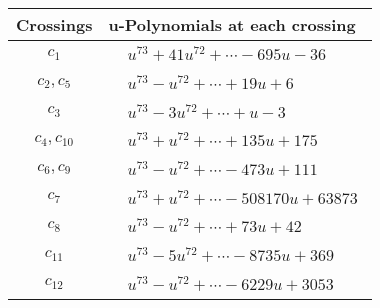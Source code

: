 \documentclass[1p]{elsarticle_modified}
\theoremstyle{definition}
\begin{document}
\begin{tabular}{m{50pt}|m{274pt}}
Crossings & \hspace{64pt}u-Polynomials at each crossing \\
\hline $$\begin{aligned}c_{1}\end{aligned}$$&$\begin{aligned}
&u^{73}+41 u^{72}+\cdots-695 u-36
\end{aligned}$\\
\hline $$\begin{aligned}c_{2},c_{5}\end{aligned}$$&$\begin{aligned}
&u^{73}- u^{72}+\cdots+19 u+6
\end{aligned}$\\
\hline $$\begin{aligned}c_{3}\end{aligned}$$&$\begin{aligned}
&u^{73}-3 u^{72}+\cdots+u-3
\end{aligned}$\\
\hline $$\begin{aligned}c_{4},c_{10}\end{aligned}$$&$\begin{aligned}
&u^{73}+u^{72}+\cdots+135 u+175
\end{aligned}$\\
\hline $$\begin{aligned}c_{6},c_{9}\end{aligned}$$&$\begin{aligned}
&u^{73}- u^{72}+\cdots-473 u+111
\end{aligned}$\\
\hline $$\begin{aligned}c_{7}\end{aligned}$$&$\begin{aligned}
&u^{73}+u^{72}+\cdots-508170 u+63873
\end{aligned}$\\
\hline $$\begin{aligned}c_{8}\end{aligned}$$&$\begin{aligned}
&u^{73}- u^{72}+\cdots+73 u+42
\end{aligned}$\\
\hline $$\begin{aligned}c_{11}\end{aligned}$$&$\begin{aligned}
&u^{73}-5 u^{72}+\cdots-8735 u+369
\end{aligned}$\\
\hline $$\begin{aligned}c_{12}\end{aligned}$$&$\begin{aligned}
&u^{73}- u^{72}+\cdots-6229 u+3053
\end{aligned}$\\
\hline
\end{tabular}\\~\\
\end{document}
